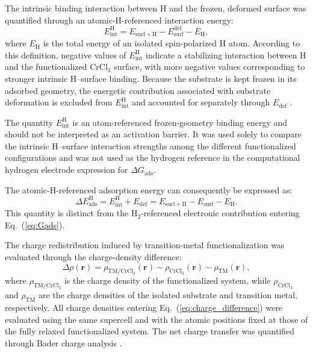\documentclass[journal=jacsat,manuscript=article]{achemso}
\begin{document}
The intrinsic binding interaction between H and the frozen, deformed surface was quantified through an atomic-H-referenced interaction energy:
\begin{equation}
    E_{\mathrm{int}}^{\mathrm{H}}
    =
    E_{\mathrm{surf+H}}
    -
    E_{\mathrm{surf}}^{\mathrm{def}}
    -
    E_{\mathrm{H}},
    \label{eq:Eint}
\end{equation}
where $E_{\mathrm{H}}$ is the total energy of an isolated spin-polarized H atom. According to this definition, negative values of $E_{\mathrm{int}}^{\mathrm{H}}$ indicate a stabilizing interaction between H and the functionalized CrCl$_3$ surface, with more negative values corresponding to stronger intrinsic H--surface binding. Because the substrate is kept frozen in its adsorbed geometry, the energetic contribution associated with substrate deformation is excluded from $E_{\mathrm{int}}^{\mathrm{H}}$ and accounted for separately through $E_{\mathrm{def}}$ \cite{Staub2019,Clabaut2020}.

The quantity $E_{\mathrm{int}}^{\mathrm{H}}$ is an atom-referenced frozen-geometry binding energy and should not be interpreted as an activation barrier. It was used solely to compare the intrinsic H--surface interaction strengths among the different functionalized configurations and was not used as the hydrogen reference in the computational hydrogen electrode expression for $\Delta G_{\mathrm{ads}}$.

The atomic-H-referenced adsorption energy can consequently be expressed as:
\begin{equation}
    \Delta E_{\mathrm{ads}}^{\mathrm{H}}
    =
    E_{\mathrm{int}}^{\mathrm{H}}
    +
    E_{\mathrm{def}}
    =
    E_{\mathrm{surf+H}}
    -
    E_{\mathrm{surf}}
    -
    E_{\mathrm{H}}.
    \label{eq:Eads_atomic}
\end{equation}
This quantity is distinct from the H$_2$-referenced electronic contribution entering Eq.~(\ref{eq:Gads}).

The charge redistribution induced by transition-metal functionalization was evaluated through the charge-density difference:
\begin{equation}
    \Delta \rho(\mathbf{r})
    =
    \rho_{\mathrm{TM/CrCl_3}}(\mathbf{r})
    -
    \rho_{\mathrm{CrCl_3}}(\mathbf{r})
    -
    \rho_{\mathrm{TM}}(\mathbf{r}),
    \label{eq:charge_difference}
\end{equation}
where $\rho_{\mathrm{TM/CrCl_3}}$ is the charge density of the functionalized system, while $\rho_{\mathrm{CrCl_3}}$ and $\rho_{\mathrm{TM}}$ are the charge densities of the isolated substrate and transition metal, respectively. All charge densities entering Eq.~(\ref{eq:charge_difference}) were evaluated using the same supercell and with the atomic positions fixed at those of the fully relaxed functionalized system. The net charge transfer was quantified through Bader charge analysis \cite{Henkelman2006,Tang_2009, SANVILLEJCC2007, YUJPCP2011}.
\end{document}
